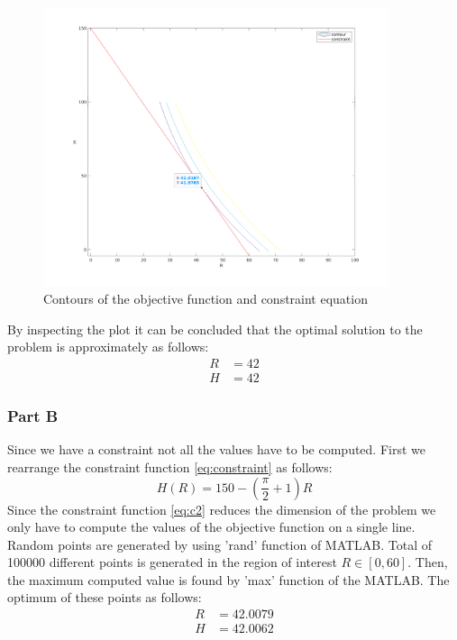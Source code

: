 \documentclass[12pt, a4paper]{article}
\numberwithin{equation}{section}
\begin{document}
\begin{figure}[ht]
  \centering
  \includegraphics[width=0.9\textwidth]{img/foo.png}
  \captionsetup{justification=centering}
  \caption{Contours of the objective function and constraint equation}
\end{figure}

By inspecting the plot it can be concluded that the optimal solution to the problem is approximately as follows:
\begin{align}
R &= 42 \\
H &= 42
\end{align}



\subsubsection{Part B}
Since we have a constraint not all the values have to be computed. First we rearrange the constraint function \ref{eq:constraint} as follows:
\begin{equation}
    H(R) = 150 - (\frac{\pi}{2}+1)R
    \label{eq:c2}
\end{equation}
Since the constraint function \ref{eq:c2} reduces the dimension of the problem we only have to compute the values of the objective function on a single line. Random points are generated by using 'rand' function of MATLAB. Total of 100000 different points is generated in the region of interest $ R \in [0, 60] $. Then, the maximum computed value is found by 'max' function of the MATLAB. The optimum of these points as follows:
\begin{align}
R &= 42.0079 \\
H &= 42.0062
\end{align}
\end{document}
